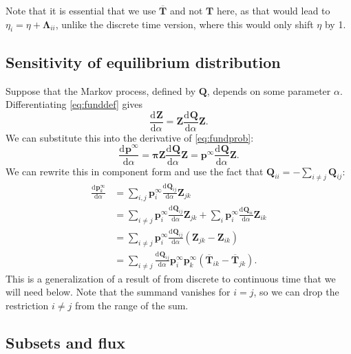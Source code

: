 \documentclass[9pt,twocolumn,twoside,lineno]{pnas-new}
\newcommand{\diff}[3][]{\frac{\mathrm{d}^{#1} #2}{\mathrm{d}{#3}^{#1}}}
\newcommand{\MM}{\mathbf{Q}}
\newcommand{\prob}{\mathbf{p}}
\newcommand{\eq}{\prob^\infty}
\newcommand{\fpt}{\mathbf{T}}
\newcommand{\fptb}{\overline{\fpt}}
\newcommand{\fund}{\mathbf{Z}}
\newcommand{\pib}{\boldsymbol{\pi}}
\newcommand{\Lb}{\boldsymbol{\Lambda}}
\begin{document}
\begin{strip}
Note that it is essential that we use $\fptb$ and not $\fpt$ here, as that would lead to $\eta_i=\eta+\Lb_{ii}$, unlike the discrete time version, where this would only shift $\eta$ by 1.

\subsection{Sensitivity of equilibrium distribution}\label{sec:sensitivity}

Suppose that the Markov process, defined by $\MM$, depends on some parameter $\alpha$.
Differentiating \cref{eq:funddef} gives
%
\begin{equation}\label{eq:diffZ}
  \diff{\fund}{\alpha} = \fund \diff{\MM}{\alpha} \fund.
\end{equation}
%
We can substitute this into the derivative of \cref{eq:fundprob}:
%
\begin{equation}\label{eq:diffp}
  \diff{\eq}{\alpha} = \pib \fund \diff{\MM}{\alpha} \fund = \eq \diff{\MM}{\alpha} \fund.
\end{equation}
%
We can rewrite this in component form and use the fact that $\MM_{ii} = - \sum_{i\neq j} \MM_{ij}$:
%
\begin{equation}\label{eq:diffpT}
\begin{aligned}
  \diff{\eq_k}{\alpha} &= \sum_{i,j} \eq_i \diff{\MM_{ij}}{\alpha} \fund_{jk} \\
    &= \sum_{i\neq j} \eq_i \diff{\MM_{ij}}{\alpha} \fund_{jk} + \sum_i \eq_i \diff{\MM_{ii}}{\alpha} \fund_{ik} \\
    &= \sum_{i\neq j} \eq_i \diff{\MM_{ij}}{\alpha} (\fund_{jk} - \fund_{ik}) \\
    &= \sum_{i\neq j} \diff{\MM_{ij}}{\alpha} \eq_i \eq_k (\fptb_{ik} - \fptb_{jk}).
\end{aligned}
\end{equation}
%
This is a generalization of a result of \cite{cho2000markov} from discrete to continuous time that we will need below.
Note that the summand vanishes for $i=j$, so we can drop the restriction $i\neq j$ from the range of the sum.

\subsection{Subsets and flux}\label{sec:subsets}


\end{strip}
\end{document}
